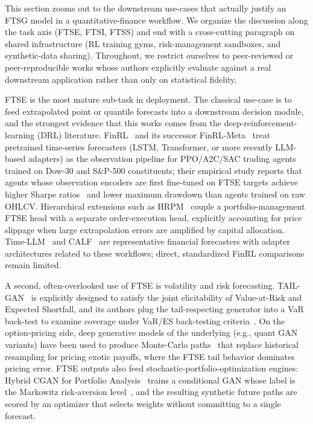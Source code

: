 \documentclass[11pt,a4paper]{article}
\begin{document}
This section zooms out to the downstream use-cases that actually justify an FTSG
model in a quantitative-finance workflow. We organize the discussion
along the task axis (FTSE, FTSI, FTSS) and end with a cross-cutting
paragraph on shared infrastructure (RL training gyms, risk-management
sandboxes, and synthetic-data sharing). Throughout, we restrict
ourselves to peer-reviewed or peer-reproducible works whose authors
explicitly evaluate against a real downstream application rather than
only on statistical fidelity.


FTSE is the most mature sub-task in deployment. The classical use-case
is to feed extrapolated point or quantile forecasts into a downstream
decision module, and the strongest evidence that this works comes from
the deep-reinforcement-learning (DRL) literature.
FinRL~\citep{liu2020finrl} and its successor
FinRL-Meta~\citep{liu2022finrlmeta} treat pretrained time-series
forecasters (LSTM, Transformer, or more recently LLM-based adapters) as
the observation pipeline for PPO/A2C/SAC trading agents~\citep{schulman2017proximal,mnih2016asynchronous,haarnoja2018soft} trained on
Dow-30 and S\&P-500 constituents; their empirical study reports that
agents whose observation encoders are first fine-tuned on FTSE targets
achieve higher Sharpe ratios~\citep{sharpe1994sharpe} and lower maximum drawdown than agents trained on
raw OHLCV. Hierarchical extensions such as
HRPM~\citep{wang2020hrpm} couple a portfolio-management FTSE head with
a separate order-execution head, explicitly accounting for price
slippage when large extrapolation errors are amplified by capital
allocation. Time-LLM~\citep{jin2024timellm} and CALF~\citep{liu2025calf} are representative financial forecasters with adapter architectures related to these workflows; direct, standardized FinRL comparisons remain limited.

A second, often-overlooked use of FTSE is volatility and risk
forecasting. TAIL-GAN~\citep{cont2025tailgan} is explicitly designed to
satisfy the joint elicitability of Value-at-Risk and Expected Shortfall,
and its authors plug the tail-respecting generator into a VaR back-test
to examine coverage under VaR/ES back-testing criteria~\citep{acerbi2014expected}. On the option-pricing side,
deep generative models of the underlying (e.g., quant GAN variants) have
been used to produce Monte-Carlo paths~\citep{boyle1977options} that replace historical
resampling for pricing exotic payoffs, where the FTSE tail behavior
dominates pricing error. FTSE outputs also feed
stochastic-portfolio-optimization engines: Hybrid CGAN for Portfolio
Analysis~\citep{lu2022hybrid} trains a conditional GAN whose label is
the Markowitz risk-aversion level~\citep{markowitz1952portfolio}, and the resulting synthetic future
paths are scored by an optimizer that selects weights without committing
to a single forecast.
\end{document}

